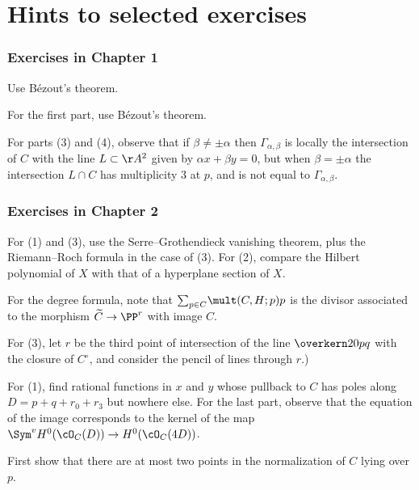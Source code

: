

\chapter*{Hints to selected exercises}
\label{hints}

\subsection*{Exercises in Chapter 1}

Use B\'ezout's theorem.

For the first part, use B\'ezout's theorem.

For parts (3) and (4), observe that if $\beta \neq \pm \alpha$ then
$\Gamma_{\alpha, \beta}$  is locally the intersection of $C$ with the
line $L \subset \AA^2$ given by $\alpha x + \beta y = 0$, but when
$\beta = \pm \alpha$
the intersection $L \cap C$ has multiplicity 3 at $p$,
and is not equal to $\Gamma_{\alpha, \beta}$.

\subsection*{Exercises in Chapter 2}

For (1) and (3), use the
%
%
%
Serre--Grothendieck vanishing theorem, plus the
Riemann--Roch formula in the case of (3).
For (2), compare the Hilbert polynomial of $X$ with that of a hyperplane section of $X$.

For
the degree formula, note that $\smash{\sum_{p\in C}}
\mult(C,H;p) p$ is the divisor associated to the morphism
$\widetilde C \to \PP^r$ with image $C$.

For (3), let $r$ be the third point of intersection of the
  line $\overkern20{pq}$ with the closure of $C^\circ$, and consider the
  pencil of lines through $r$.)

For (1), find rational functions in $x$ and $y$ whose pullback to $C$
has poles along $D = p + q + r_0 + r_3$ but nowhere else. For the last
part, observe that the equation of the image corresponds to the kernel
of the map $\Sym^v H^0(\cO_C(D)) \to H^0(\cO_C(4D))$.

First show that there are at most two points in the normalization of
$C$ lying over $p$.

